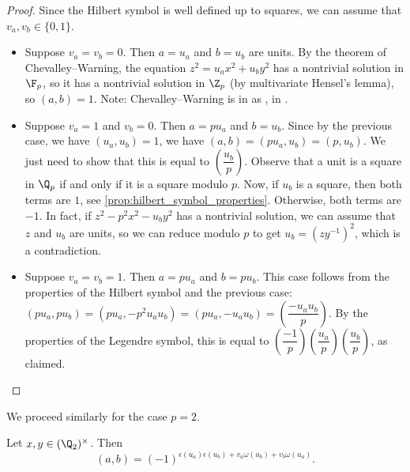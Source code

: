 \begin{proof}
	Since the Hilbert symbol is well defined up to squares, we can assume that $v_a, v_b \in \{0, 1\}$.
	\begin{itemize}
		\item Suppose $v_a=v_b=0$. Then $a=u_a$ and $b=u_b$ are units. By the theorem of Chevalley--Warning,
		the equation $z^2 = u_a x^2 + u_b y^2$ has a nontrivial solution in $\F_p$, so it has a
		nontrivial solution in $\Z_p$ (by multivariate Hensel's lemma), so $(a,b)=1$.
		Note: Chevalley--Warning is in \mathlib as , in .
		\item Suppose $v_a=1$ and $v_b=0$. Then $a=p u_a$ and $b=u_b$. Since by the previous case, we
		have $(u_a, u_b)=1$, we have $(a,b) = (p u_a, u_b) = (p, u_b)$. We just need to show that this is
		equal to $\left(\dfrac{u_b}{p}\right)$. Observe that a unit is a square in $\Q_p$ if and only if
		it is a square modulo $p$. Now, if $u_b$ is a square, then both terms are $1$, see
		\ref{prop:hilbert_symbol_properties}. Otherwise, both terms are $-1$. In fact,
		if $z^2-p^2x^2-u_by^2$ has a nontrivial solution, we can assume that $z$ and $u_b$ are units, so
		we can reduce modulo $p$ to get $u_b = (zy^{-1})^2$, which is a contradiction.
		\item Suppose $v_a=v_b=1$. Then $a=p u_a$ and $b=p u_b$. This case follows from the properties of
		the Hilbert symbol and the previous case: $(pu_a,pu_b)=(pu_a, -p^2u_au_b)= (pu_a, -u_au_b)=
		\left(\dfrac{-u_au_b}{p}\right)$. By the properties of the Legendre symbol, this is equal to
		$\left(\dfrac{-1}{p}\right)\left(\dfrac{u_a}{p}\right)\left(\dfrac{u_b}{p}\right)$, as claimed.
	\end{itemize}
\end{proof}

We proceed similarly for the case $p = 2$.

\begin{theorem}
	\label{thm:padic_2}
	\leanok
Let $x,y \in (\Q_2)^\times$. Then
\[(a,b) = (-1)^{\epsilon(u_a)\epsilon(u_b) + v_a \omega(u_b) + v_b  \omega(u_a)}.\]
\end{theorem}

